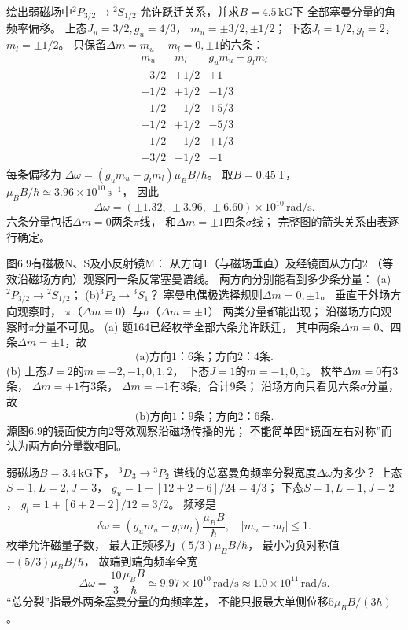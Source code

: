 绘出弱磁场中\({}^{2}P_{3/2}\to{}^{2}S_{1/2}\)
允许跃迁关系，并求$B=4.5\,\mathrm{kG}$下
全部塞曼分量的角频率偏移。
\exsolution
上态$J_u=3/2,g_u=4/3$，
$m_u=\pm3/2,\pm1/2$；
下态$J_l=1/2,g_l=2$，
$m_l=\pm1/2$。
只保留$\Delta m=m_u-m_l=0,\pm1$的六条：
\[
 \begin{array}{c|c|c}
 m_u&m_l&g_um_u-g_lm_l\\\hline
 +3/2&+1/2&+1\\
 +1/2&+1/2&-1/3\\
 +1/2&-1/2&+5/3\\
 -1/2&+1/2&-5/3\\
 -1/2&-1/2&+1/3\\
 -3/2&-1/2&-1
 \end{array}
\]
每条偏移为
$\Delta\omega=(g_um_u-g_lm_l)\mu_BB/\hbar$。
取$B=0.45\,\mathrm T$，
$\mu_BB/\hbar\simeq3.96\times10^{10}\,\mathrm{s^{-1}}$，
因此
\[
 \boxed{\Delta\omega=
 (\pm1.32,\ \pm3.96,\ \pm6.60)\times10^{10}\,
 \mathrm{rad/s}}.
\]
\excheck 六条分量包括$\Delta m=0$两条$\pi$线，
和$\Delta m=\pm1$四条$\sigma$线；
完整图的箭头关系由表逐行确定。

图6.9有磁极N、S及小反射镜M：
从方向1（与磁场垂直）及经镜面从方向2
（等效沿磁场方向）观察同一条反常塞曼谱线。
两方向分别能看到多少条分量：
(a)\({}^{2}P_{3/2}\to{}^{2}S_{1/2}\)；
(b)\({}^{3}P_2\to{}^{3}S_1\)？
\exsolution
塞曼电偶极选择规则$\Delta m=0,\pm1$。
垂直于外场方向观察时，
$\pi$（$\Delta m=0$）与$\sigma$（$\Delta m=\pm1$）
两类分量都能出现；
沿磁场方向观察时$\pi$分量不可见。
(a) 题164已经枚举全部六条允许跃迁，
其中两条$\Delta m=0$、四条$\Delta m=\pm1$，故
\[
 \boxed{\text{(a)方向1：6条；方向2：4条}}.
\]
(b) 上态$J=2$的$m=-2,-1,0,1,2$，
下态$J=1$的$m=-1,0,1$。
枚举$\Delta m=0$有3条，
$\Delta m=+1$有3条，
$\Delta m=-1$有3条，合计9条；
沿场方向只看见六条$\sigma$分量，故
\[
 \boxed{\text{(b)方向1：9条；方向2：6条}}.
\]
\excheck 源图6.9的镜面使方向2等效观察沿磁场传播的光；
不能简单因“镜面左右对称”而认为两方向分量数相同。

弱磁场$B=3.4\,\mathrm{kG}$下，
\({}^{3}D_3\to{}^{3}P_2\)
谱线的总塞曼角频率分裂宽度$\Delta\omega$为多少？
\exsolution
上态$S=1,L=2,J=3$，
$g_u=1+[12+2-6]/24=4/3$；
下态$S=1,L=1,J=2$，
$g_l=1+[6+2-2]/12=3/2$。
频移是
\[
 \delta\omega=(g_um_u-g_lm_l)\frac{\mu_BB}{\hbar},
 \quad |m_u-m_l|\le1.
\]
枚举允许磁量子数，
最大正频移为
$(5/3)\mu_BB/\hbar$，
最小为负对称值
$-(5/3)\mu_BB/\hbar$，
故端到端角频率全宽
\[
 \boxed{\Delta\omega=
 \frac{10}{3}\frac{\mu_BB}{\hbar}
 \simeq9.97\times10^{10}\,\mathrm{rad/s}
 \approx1.0\times10^{11}\,\mathrm{rad/s}}.
\]
\excheck “总分裂”指最外两条塞曼分量的角频率差，
不能只报最大单侧位移$5\mu_BB/(3\hbar)$。
